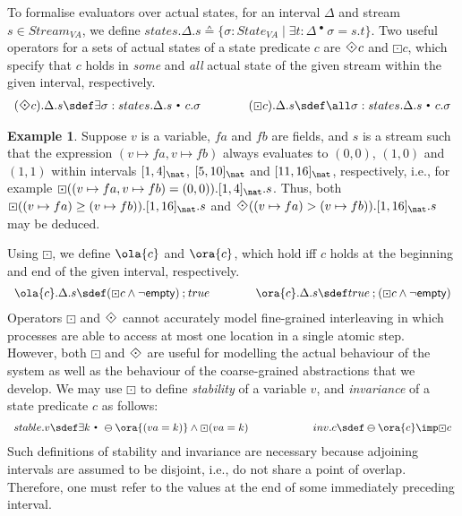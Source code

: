 \documentclass{article}
\newcommand{\st}{~{\scriptscriptstyle ^\bullet}~}
\theoremstyle{plain}
\theoremstyle{definition}
\newtheorem{example}{Example}[section]
\newcommand{\prev}{\varominus}
\newcommand{\Empty}{{\sf empty}}
\newcommand{\Always}{\textstyle\mathord{\boxdot}}
\newcommand{\Sometime}{\raisebox{0.1em}{\rotatebox[origin=c]{45}{$\textstyle\boxdot$}}}
\def\ch{\mathbin{;}}
\begin{document}
\smallskip

To formalise evaluators over actual states, for an interval $\Delta$
and stream $s \in Stream_{VA}$, we define $states.\Delta.s \sdef
\{\sigma : State_{VA} \mid \exists t : \Delta \st \sigma = s.t
\}$. Two useful operators for a sets of actual states of a state
predicate $c$ are $\Sometime c$ and $\Always c$, which specify that
$c$ holds in \emph{some} and \emph{all} actual state of the given
stream within the given interval, respectively. 
$$\begin{array}[t]{rcl}
  (\Sometime c).\Delta.s \sdef  \exists \sigma : states.\Delta.s \st
  c.\sigma 
  & \qquad & 
  (\Always c).\Delta.s \sdef \all \sigma : states.\Delta.s \st
  c.\sigma 
\end{array}$$

\begin{example} \label{ex:uv} Suppose $v$ is a variable, $fa$ and $fb$
  are fields, and $s$ is a stream such that the expression $(v \mapsto
  fa, v \mapsto fb)$ always evaluates to $(0, 0)$, $(1, 0)$ and $(1,
  1)$ within intervals $[1, 4]_\nat$, $[5,10]_\nat$ and
  $[11,16]_\nat$, respectively, i.e., for example $\Always ((v \mapsto
  fa, v \mapsto fb) = (0, 0)). [1, 4]_\nat.s$. Thus, both $\Always ((v
  \mapsto fa) \geq (v \mapsto fb)).[1,16]_\nat.s$ and $\Sometime ((v
  \mapsto fa) > (v \mapsto fb)).[1,16]_\nat.s$ may be deduced.
\end{example}

Using $\Always$, we define $\ola{c}$ and $\ora{c}$, which hold iff $c$
holds at the beginning and end of the given interval, respectively. 
$$
\begin{array}[t]{r@{\qquad\qquad}l}
  \ola{c}.\Delta.s
  \sdef (\Always c \land \neg \Empty) \ch true
  &
  \ora{c}.\Delta.s \sdef true \ch (\Always c \land \neg \Empty)
\end{array}
$$
Operators $\Always$ and $\Sometime$ cannot accurately model
fine-grained interleaving in which processes are able to access at
most one location in a single atomic step. However, both $\Always$ and
$\Sometime$ are useful for modelling the actual behaviour of the
system as well as the behaviour of the coarse-grained abstractions
that we develop. We may use $\Always$ to define \emph{stability} of a
variable $v$, and \emph{invariance} of a state predicate $c$ as
follows:
$$\begin{array}[t]{rcl}
  stable.v  \sdef        \exists k \st \prev \ora{(va = k)} \land \Always (va
      = k) & \qquad\qquad &
inv.c \sdef  \prev \ora{c} \imp \Always c
\end{array}$$
\noindent
Such definitions of stability and invariance are necessary because
adjoining intervals are assumed to be disjoint, i.e., do not share a
point of overlap. Therefore, one must refer to the values at the end
of some immediately preceding interval. \smallskip
\end{document}
